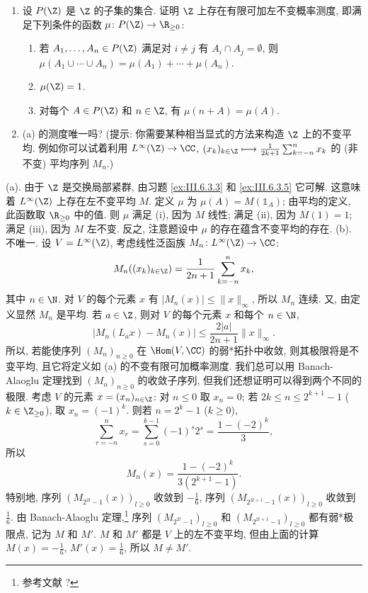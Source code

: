 \begin{exercise}[$\Z$ 上的不变概率测度]
\label{ex:III.6.3.6}
\begin{enumerate}
\item[(a)] 设 $P(\Z)$ 是 $\Z$ 的子集的集合. 证明 $\Z$ 上存在有限可加左不变概率测度, 即满足下列条件的函数 $\mu \colon P(\Z) \to \R_{\geq 0}$:
\begin{enumerate}
\item[(i)] 若 $A_1, \ldots, A_n \in P(\Z)$ 满足对 $i \neq j$ 有 $A_i \cap A_j = \emptyset$, 则 $\mu(A_1 \cup \cdots \cup A_n) = \mu(A_1) + \cdots + \mu(A_n)$.
\item[(ii)] $\mu(\Z) = 1$.
\item[(iii)] 对每个 $A \in P(\Z)$ 和 $n \in \Z$, 有 $\mu(n + A) = \mu(A)$.
\end{enumerate}
\item[(b)] (a) 的测度唯一吗? (提示: 你需要某种相当显式的方法来构造 $\Z$ 上的不变平均. 例如你可以试着利用 $L^{\infty}(\Z) \to \CC$, $(x_k)_{k \in \Z} \longmapsto \frac{1}{2k+1}\sum_{k=-n}^n x_k$ 的 (非不变) 平均序列 $M_n$.)
\end{enumerate}
\end{exercise}

\begin{solution}
(a). 由于 $\Z$ 是交换局部紧群, 由习题 \ref{ex:III.6.3.3} 和 \ref{ex:III.6.3.5} 它可解. 这意味着 $L^{\infty}(\Z)$ 上存在左不变平均 $M$. 定义 $\mu$ 为 $\mu(A) = M(\mathbb{1}_A)$; 由平均的定义, 此函数取 $\R_{\geq 0}$ 中的值. 则 $\mu$ 满足 (i), 因为 $M$ 线性; 满足 (ii), 因为 $M(1) = 1$; 满足 (iii), 因为 $M$ 左不变.
反之, 注意题设中 $\mu$ 的存在蕴含不变平均的存在.
(b). 不唯一.
设 $V = L^{\infty}(\Z)$, 考虑线性泛函族 $M_n \colon L^{\infty}(\Z) \to \CC$:
\[
M_n((x_k)_{k \in \Z}) = \frac{1}{2n+1}\sum_{k=-n}^n x_k,
\]
其中 $n \in \N$. 对 $V$ 的每个元素 $x$ 有 $|M_n(x)| \leq \|x\|_{\infty}$, 所以 $M_n$ 连续. 又, 由定义显然 $M_n$ 是平均. 若 $a \in \Z$, 则对 $V$ 的每个元素 $x$ 和每个 $n \in \N$,
\[
|M_n(L_ax) - M_n(x)| \leq \frac{2|a|}{2n+1}\|x\|_{\infty}.
\]
所以, 若能使序列 $(M_n)_{n \geq 0}$ 在 $\Hom(V, \CC)$ 的弱*拓扑中收敛, 则其极限将是不变平均, 且它将定义如 (a) 的不变有限可加概率测度. 我们总可以用 Banach-Alaoglu 定理找到 $(M_n)_{n \geq 0}$ 的收敛子序列, 但我们还想证明可以得到两个不同的极限.
考虑 $V$ 的元素 $x = (x_n)_{n \in \Z}$: 对 $n \leq 0$ 取 $x_n = 0$; 若 $2k \leq n \leq 2^{k+1} - 1$ ($k \in \Z_{\geq 0}$), 取 $x_n = (-1)^k$. 则若 $n = 2^k - 1$ ($k \geq 0$),
\[
\sum_{r=-n}^n x_r = \sum_{s=0}^{k-1}(-1)^s2^s = \frac{1 - (-2)^k}{3},
\]
所以
\[
M_n(x) = \frac{1 - (-2)^k}{3(2^{k+1} - 1)}.
\]
特别地, 序列 $(M_{2^{2l}-1}(x))_{l \geq 0}$ 收敛到 $-\frac{1}{6}$, 序列 $(M_{2^{2l+1}-1}(x))_{l \geq 0}$ 收敛到 $\frac{1}{6}$.
由 Banach-Alaoglu 定理,\footnote{参考文献 ?} 序列 $(M_{2^{2l}-1})_{l \geq 0}$ 和 $(M_{2^{2l+1}-1})_{l \geq 0}$ 都有弱*极限点, 记为 $M$ 和 $M'$. $M$ 和 $M'$ 都是 $V$ 上的左不变平均, 但由上面的计算 $M(x) = -\frac{1}{6}$, $M'(x) = \frac{1}{6}$, 所以 $M \neq M'$.
\end{solution}


